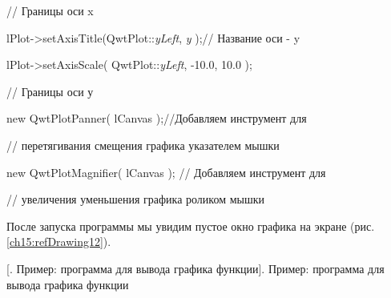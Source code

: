 // Границы оси x

lPlot-{>}setAxisTitle(QwtPlot::\textit{yLeft}, \textit{y} );// Название оси - y

lPlot-{>}setAxisScale( QwtPlot::\textit{yLeft}, -10.0, 10.0 );

// Границы оси у

new QwtPlotPanner( lCanvas );//Добавляем инструмент для

// перетягивания смещения графика указателем мышки

new QwtPlotMagnifier( lCanvas ); // Добавляем инструмент для

// увеличения уменьшения графика роликом мышки

После запуска программы мы увидим пустое окно графика на экране (рис. \ref{ch15:refDrawing12}).

{%
[. Пример: программа для вывода графика функции]{. Пример: программа для вывода графика функции}
\label{ch15:refDrawing12}
\par}

